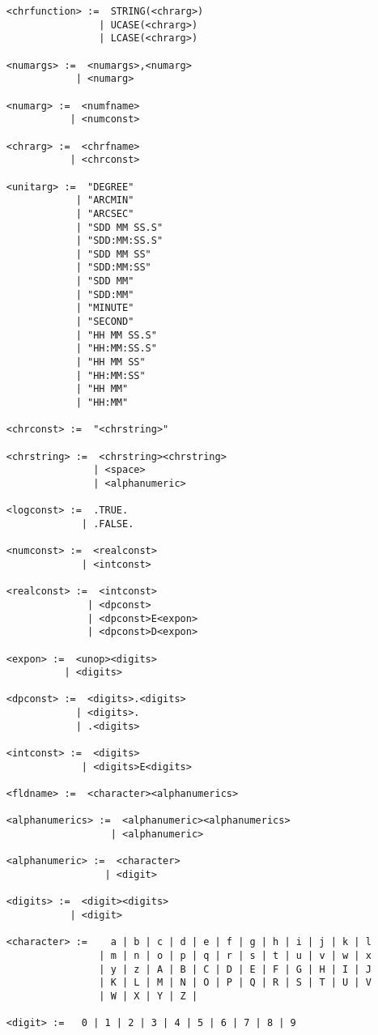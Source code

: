 \begin{small}
\begin{verbatim}
     <chrfunction> :=  STRING(<chrarg>)
                     | UCASE(<chrarg>)
                     | LCASE(<chrarg>)

     <numargs> :=  <numargs>,<numarg>
                 | <numarg>

     <numarg> :=  <numfname>
                | <numconst>

     <chrarg> :=  <chrfname>
                | <chrconst>

     <unitarg> :=  "DEGREE"
                 | "ARCMIN"
                 | "ARCSEC"
                 | "SDD MM SS.S"
                 | "SDD:MM:SS.S"
                 | "SDD MM SS"
                 | "SDD:MM:SS"
                 | "SDD MM"
                 | "SDD:MM"
                 | "MINUTE"
                 | "SECOND"
                 | "HH MM SS.S"
                 | "HH:MM:SS.S"
                 | "HH MM SS"
                 | "HH:MM:SS"
                 | "HH MM"
                 | "HH:MM"

     <chrconst> :=  "<chrstring>"

     <chrstring> :=  <chrstring><chrstring>
                    | <space>
                    | <alphanumeric>

     <logconst> :=  .TRUE.
                  | .FALSE.

     <numconst> :=  <realconst>
                  | <intconst>

     <realconst> :=  <intconst>
                   | <dpconst>
                   | <dpconst>E<expon>
                   | <dpconst>D<expon>

     <expon> :=  <unop><digits>
               | <digits>

     <dpconst> :=  <digits>.<digits>
                 | <digits>.
                 | .<digits>

     <intconst> :=  <digits>
                  | <digits>E<digits>

     <fldname> :=  <character><alphanumerics>

     <alphanumerics> :=  <alphanumeric><alphanumerics>
                       | <alphanumeric>

     <alphanumeric> :=  <character>
                      | <digit>

     <digits> :=  <digit><digits>
                | <digit>

     <character> :=    a | b | c | d | e | f | g | h | i | j | k | l
                     | m | n | o | p | q | r | s | t | u | v | w | x
                     | y | z | A | B | C | D | E | F | G | H | I | J
                     | K | L | M | N | O | P | Q | R | S | T | U | V
                     | W | X | Y | Z |

     <digit> :=   0 | 1 | 2 | 3 | 4 | 5 | 6 | 7 | 8 | 9
\end{verbatim}
\end{small}

